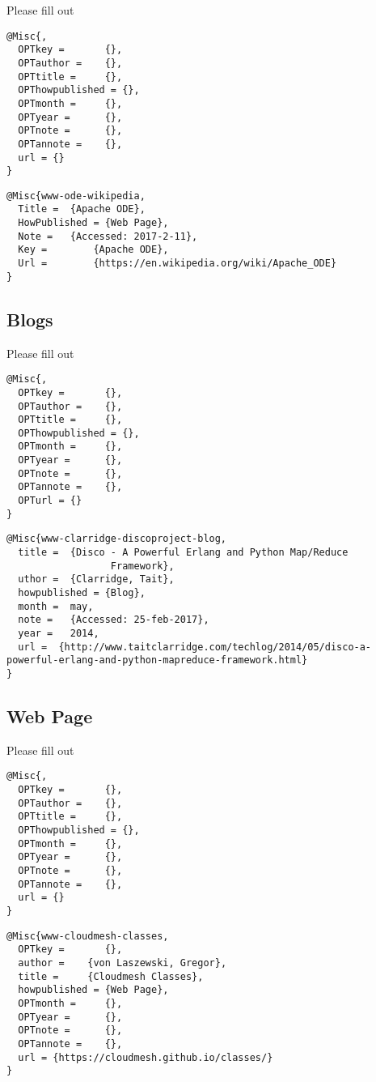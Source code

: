 Please fill out

\begin{verbatim}
@Misc{,
  OPTkey =       {},
  OPTauthor =    {},
  OPTtitle =     {},
  OPThowpublished = {},
  OPTmonth =     {},
  OPTyear =      {},
  OPTnote =      {},
  OPTannote =    {},
  url = {}
}
\end{verbatim}

\begin{verbatim}
@Misc{www-ode-wikipedia,
  Title =  {Apache ODE},
  HowPublished = {Web Page},
  Note =   {Accessed: 2017-2-11},
  Key =        {Apache ODE},
  Url =        {https://en.wikipedia.org/wiki/Apache_ODE}
}
\end{verbatim}

\subsection{Blogs}\label{blogs}

Please fill out

\begin{verbatim}
@Misc{,
  OPTkey =       {},
  OPTauthor =    {},
  OPTtitle =     {},
  OPThowpublished = {},
  OPTmonth =     {},
  OPTyear =      {},
  OPTnote =      {},
  OPTannote =    {},
  OPTurl = {}
}
\end{verbatim}

\begin{verbatim}
@Misc{www-clarridge-discoproject-blog,
  title =  {Disco - A Powerful Erlang and Python Map/Reduce
                  Framework},
  uthor =  {Clarridge, Tait},
  howpublished = {Blog},
  month =  may,
  note =   {Accessed: 25-feb-2017},
  year =   2014,
  url =  {http://www.taitclarridge.com/techlog/2014/05/disco-a-powerful-erlang-and-python-mapreduce-framework.html}
}
\end{verbatim}

\subsection{Web Page}\label{web-page}

Please fill out

\begin{verbatim}
@Misc{, 
  OPTkey =       {}, 
  OPTauthor =    {}, 
  OPTtitle =     {}, 
  OPThowpublished = {}, 
  OPTmonth =     {}, 
  OPTyear =      {}, 
  OPTnote =      {},
  OPTannote =    {},
  url = {}
}
\end{verbatim}

\begin{verbatim}
@Misc{www-cloudmesh-classes,
  OPTkey =       {},
  author =    {von Laszewski, Gregor},
  title =     {Cloudmesh Classes},
  howpublished = {Web Page},
  OPTmonth =     {},
  OPTyear =      {},
  OPTnote =      {},
  OPTannote =    {},
  url = {https://cloudmesh.github.io/classes/}
}
\end{verbatim}

